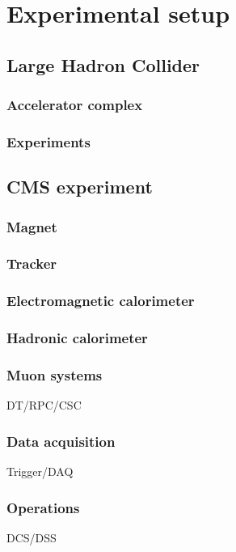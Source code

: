 \chapter{Experimental setup}


\section{Large Hadron Collider}

\subsection{Accelerator complex}

\subsection{Experiments}

\section{CMS experiment}

\subsection{Magnet}

\subsection{Tracker}

\cite{Chatrchyan:2014fea}

\subsection{Electromagnetic calorimeter}

\subsection{Hadronic calorimeter}

\subsection{Muon systems}
DT/RPC/CSC

\subsection{Data acquisition}
Trigger/DAQ

\subsection{Operations}
DCS/DSS
